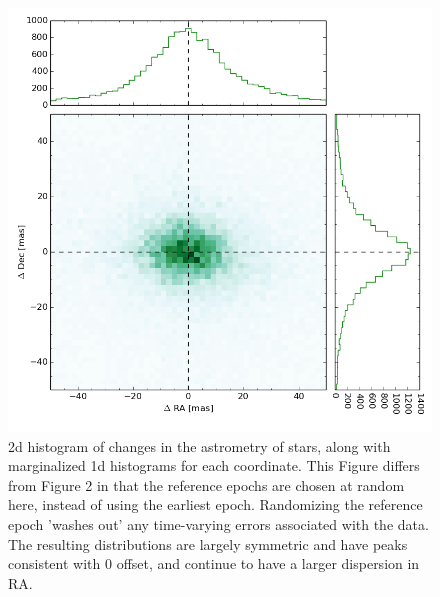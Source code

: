 \documentclass[DM,toc]{lsstdoc}
\begin{document}
\begin{figure}
	\includegraphics[width=.9\textwidth]{ra_dec_random.png}
    \caption{2d histogram of changes in the astrometry of stars, along with marginalized 1d histograms for each coordinate. This Figure differs from Figure 2 in that the reference epochs are chosen at random here, instead of using the earliest epoch. Randomizing the reference epoch 'washes out' any time-varying errors associated with the data. The resulting distributions are largely symmetric and have peaks consistent with 0 offset, and continue to have a larger dispersion in RA.}
\end{figure}
\end{document}
